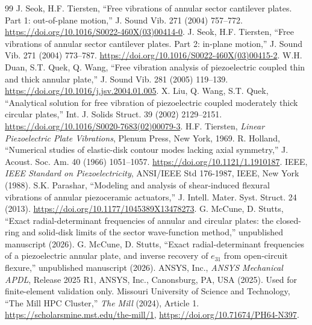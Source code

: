 \documentclass[11pt]{article}
\begin{document}
\clearpage
\begin{thebibliography}{99}\small
\setlength{\itemsep}{0pt}
\setlength{\parsep}{0pt}
 J. Seok, H.F. Tiersten, ``Free vibrations of annular sector
cantilever plates. Part 1: out-of-plane motion,'' J. Sound Vib. 271 (2004)
757--772. \url{https://doi.org/10.1016/S0022-460X(03)00414-0}.
 J. Seok, H.F. Tiersten, ``Free vibrations of annular sector
cantilever plates. Part 2: in-plane motion,'' J. Sound Vib. 271 (2004)
773--787. \url{https://doi.org/10.1016/S0022-460X(03)00415-2}.
 W.H. Duan, S.T. Quek, Q. Wang, ``Free vibration analysis
of piezoelectric coupled thin and thick annular plate,'' J. Sound Vib. 281
(2005) 119--139. \url{https://doi.org/10.1016/j.jsv.2004.01.005}.
 X. Liu, Q. Wang, S.T. Quek, ``Analytical solution for free
vibration of piezoelectric coupled moderately thick circular plates,''
Int. J. Solids Struct. 39 (2002) 2129--2151.
\url{https://doi.org/10.1016/S0020-7683(02)00079-3}.
 H.F. Tiersten, \emph{Linear Piezoelectric Plate
Vibrations}, Plenum Press, New York, 1969.
 R. Holland, ``Numerical studies of elastic-disk
contour modes lacking axial symmetry,'' J. Acoust. Soc. Am. 40 (1966)
1051--1057. \url{https://doi.org/10.1121/1.1910187}.
 IEEE, \emph{IEEE Standard on Piezoelectricity}, ANSI/IEEE
Std 176-1987, IEEE, New York (1988).
 S.K. Parashar, ``Modeling and analysis of
shear-induced flexural vibrations of annular piezoceramic actuators,''
J. Intell. Mater. Syst. Struct. 24 (2013).
\url{https://doi.org/10.1177/1045389X13478273}.
 G. McCune, D. Stutts, ``Exact radial-determinant
frequencies of annular and circular plates: the closed-ring and solid-disk
limits of the sector wave-function method,'' unpublished manuscript (2026).
 G. McCune, D. Stutts, ``Exact radial-determinant
frequencies of a piezoelectric annular plate, and inverse recovery of
$e_{31}$ from open-circuit flexure,'' unpublished manuscript (2026).
 ANSYS, Inc., \emph{ANSYS Mechanical APDL}, Release 2025 R1,
ANSYS, Inc., Canonsburg, PA, USA (2025). Used for finite-element validation
only.
 Missouri University of Science and Technology, ``The Mill
HPC Cluster,'' \emph{The Mill} (2024), Article 1.
\url{https://scholarsmine.mst.edu/the-mill/1},
\url{https://doi.org/10.71674/PH64-N397}.
\end{thebibliography}
\end{document}
